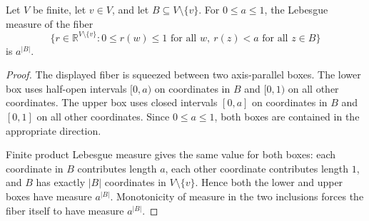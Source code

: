 \begin{helper}
Let \(V\) be finite, let \(v\in V\), and let \(B\subseteq V\setminus\{v\}\).
For \(0\le a\le 1\), the Lebesgue measure of the fiber
\[
\{r\in \mathbb R^{V\setminus\{v\}}: 0\le r(w)\le 1\text{ for all }w,\ 
r(z)<a\text{ for all }z\in B\}
\]
is \(a^{|B|}\).
\end{helper}
\begin{proof}
The displayed fiber is squeezed between two axis-parallel boxes.  The lower
box uses half-open intervals \([0,a)\) on coordinates in \(B\) and \([0,1)\)
on all other coordinates.  The upper box uses closed intervals \([0,a]\) on
coordinates in \(B\) and \([0,1]\) on all other coordinates.  Since
\(0\le a\le 1\), both boxes are contained in the appropriate direction.

Finite product Lebesgue measure gives the same value for both boxes:
each coordinate in \(B\) contributes length \(a\), each other coordinate
contributes length \(1\), and \(B\) has exactly \(|B|\) coordinates in
\(V\setminus\{v\}\).  Hence both the lower and upper boxes have measure
\(a^{|B|}\).  Monotonicity of measure in the two inclusions forces the fiber
itself to have measure \(a^{|B|}\).
\end{proof}
